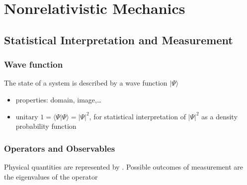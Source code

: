 \documentclass[letterpaper,10pt,english]{jupyterBook}
\begin{document}
\section{Non\sphinxhyphen{}relativistic Mechanics}
\label{\detokenize{ch/quantum-mechanics/intro:non-relativistic-mechanics}}

\subsection{Statistical Interpretation and Measurement}
\label{\detokenize{ch/quantum-mechanics/intro:statistical-interpretation-and-measurement}}

\subsubsection{Wave function}
\label{\detokenize{ch/quantum-mechanics/intro:wave-function}}
\sphinxAtStartPar
The state of a system is described by a wave function \(|\Psi\rangle\)

\sphinxAtStartPar
{}
\begin{itemize}
\item {} 
\sphinxAtStartPar
properties: domain, image,…

\item {} 
\sphinxAtStartPar
unitary \(1 = \langle \Psi | \Psi \rangle = \left| \Psi \right|^2\), for statistical interpretation of \(\left| \Psi \right|^2\) as a density probability function

\end{itemize}


\subsubsection{Operators and Observables}
\label{\detokenize{ch/quantum-mechanics/intro:operators-and-observables}}
\sphinxAtStartPar
Physical  quantities are represented by {\hyperref[\detokenize{ch/quantum-mechanics/intro:quantum-mechanics-math-operators-self-adjoint}]{}}. Possible outcomes of measurement are the eigenvalues of the operator
\end{document}
